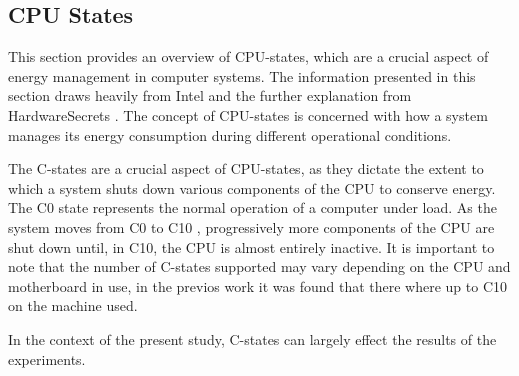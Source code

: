 \subsection{CPU States}\label{subsec:cpustates}

This section provides an overview of CPU-states, which are a crucial aspect of energy management in computer systems. The information presented in this section draws heavily from Intel \cite{CIntel} and the further explanation from HardwareSecrets \cite{CHard}. The concept of CPU-states is concerned with how a system manages its energy consumption during different operational conditions.

The C-states are a crucial aspect of CPU-states, as they dictate the extent to which a system shuts down various components of the CPU to conserve energy. The C0 state represents the normal operation of a computer under load. As the system moves from C0 to C10 \cite{biksbois}, progressively more components of the CPU are shut down until, in C10, the CPU is almost entirely inactive. It is important to note that the number of C-states supported may vary depending on the CPU and motherboard in use, in the previos work\cite{biksbois} it was found that there where up to C10 on the machine used.




In the context of the present study, C-states can largely effect the results of the experiments.
